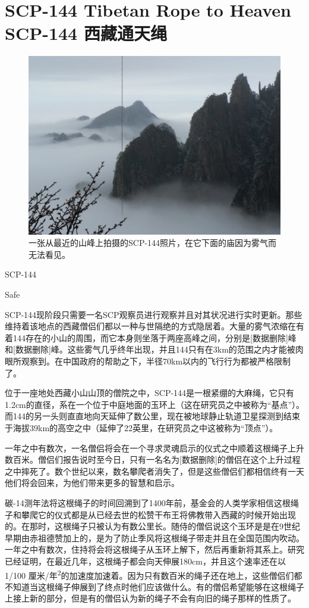 \chapter[SCP-144 西藏通天绳]{
    SCP-144 Tibetan Rope to Heaven\\
    SCP-144 西藏通天绳
}

\label{chap:SCP-144}

\begin{figure}[H]
    \centering
    \includegraphics[width=0.5\linewidth]{images/SCP-144.jpg}
    \caption*{一张从最近的山峰上拍摄的SCP-144照片，在它下面的庙因为雾气而无法看见。}
\end{figure}

SCP-144

Safe

SCP-144现阶段只需要一名SCP观察员进行观察并且对其状况进行实时更新。那些维持着该地点的西藏僧侣们都以一种与世隔绝的方式隐居着。大量的雾气浓缩在有着144存在的小山的周围，而它本身则坐落于两座高峰之间，分别是{[}数据删除]峰和{[}数据删除]峰。这些雾气几乎终年出现，并且144只有在3km的范围之内才能被肉眼所观察到。在中国政府的帮助之下，半径70km以内的飞行行为都被严格限制了。

位于一座地处西藏小山山顶的僧院之中，SCP-144是一根紧绷的大麻绳，它只有1.2cm的直径，系在一个位于中庭地面的玉环上（这在研究员之中被称为“基点”）。而144的另一头则直直地向天延伸了数公里，现在被地球静止轨道卫星探测到结束于海拔39km的高空之中（延伸了22英里，在研究员之中这被称为“顶点”）。

一年之中有数次，一名僧侣将会在一个寻求灵魂启示的仪式之中顺着这根绳子上升数百米。僧侣们报告说时至今日，只有一名名为{[}数据删除]的僧侣在这个上升过程之中摔死了。数个世纪以来，数名攀爬者消失了，但是这些僧侣们都相信终有一天他们将会回来，为他们带来更多的智慧和启示。

碳-14测年法将这根绳子的时间回溯到了1400年前，基金会的人类学家相信这根绳子和攀爬它的仪式都是从已经去世的松赞干布王将佛教带入西藏的时候开始出现的。在那时，这根绳子只被认为有数公里长。随侍的僧侣说这个玉环是是在9世纪早期由赤祖德赞加上的，是为了防止季风将这根绳子带走并且在全国范围内吹动。一年之中有数次，住持将会将这根绳子从玉环上解下，然后再重新将其系上。研究已经证明，在最近几年，这根绳子都会向天伸展180cm，并且这个速率还在以1\slash 100 厘米\slash 年\textsuperscript{2}的加速度加速着。因为只有数百米的绳子还在地上，这些僧侣们都不知道当这根绳子伸展到了终点时他们应该做什么。有的僧侣希望能够在这根绳子上接上新的部分，但是有的僧侣认为新的绳子不会有向旧的绳子那样的性质了。


